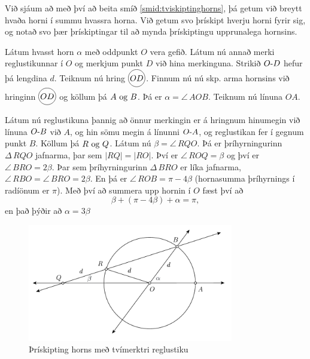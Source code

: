 \begin{frame}
  Við sjáum að með því að beita smíð \ref{smid:tviskiptinghorns}, þá getum við
  breytt hvaða horni í summu hvassra horna. Við getum svo þrískipt hverju horni fyrir
  sig, og notað svo þær þrískiptingar til að mynda þrískiptingu upprunalega hornsins.
\end{frame}

\begin{frame}[allowframebreaks]
  \begin{smid}
    \label{smid:thriskipting}
    Látum hvasst horn \(\alpha\)
    með oddpunkt \(O\)
    vera gefið. Látum nú annað merki reglustikunnar í \(O\)
    og merkjum punkt \(D\)
    við hina merkinguna. Strikið \(\lin{O}{D}\)
    hefur þá lengdina \(d\).
    Teiknum nú hring \(\hri{OD}\).
    Finnum nú nú skp. arma hornsins við hringinn \(\hri{OD}\)
    og köllum þá
    \(A \Og B\). Þá er \(\alpha = \angle\, AOB\). Teiknum nú línuna \(OA\).

    \theorembreak
    
    Látum nú reglustikuna þannig að önnur merkingin er á hringnum hinumegin
    við línuna \(\lin{O}{B}\) við \(A\), og hin sömu megin á línunni \(\lin{O}{A}\),
    og reglustikan fer í gegnum punkt \(B\). Köllum þá \(R \Og Q\). Látum nú
    \(\beta = \angle\, RQO\). Þá er þríhyrningurinn \(\Delta\, RQO\) jafnarma,
    þar sem \(|RQ| = |RO|\). Því er \(\angle\, ROQ = \beta\) og því er
    \(\angle\, BRO = 2 \beta\). Þar sem þríhyrningurinn \(\Delta\, BRO\)
    er líka jafnarma, \(\angle\, RBO = \angle\, BRO = 2\beta\). En þá er
    \(\angle\, ROB = \pi - 4\beta\) (hornasumma þríhyrnings í radíönum er \(\pi\)).
    Með því að summera upp hornin í \(O\) fæst því að
    \[ \beta + (\pi - 4\beta) + \alpha = \pi,\]
    en það þýðir að \(\alpha = 3\beta\)
  \end{smid}
\end{frame}

\begin{frame}
  \begin{figure}[H]
    \centering
    \includegraphics[width=0.8\textwidth]{TwiceNotched.png}
    \caption{Þrískipting horns með tvímerktri reglustiku}
    \label{fig:thriskipt}
  \end{figure}
\end{frame}


